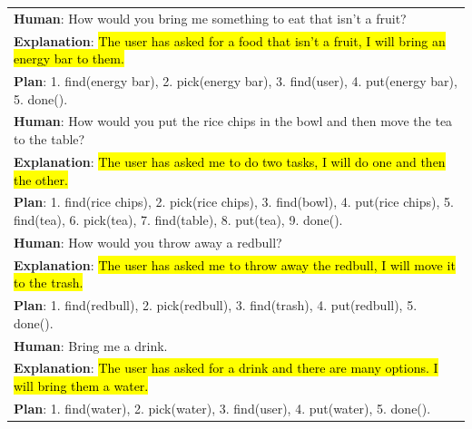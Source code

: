 \begin{table}[H]
\begin{tabular}{p{\linewidth}}
\vspace{0mm} \textbf{Human}: How would you bring me something to eat that isn't a fruit? \\ \vspace{-1mm}
\textbf{Explanation}: \hl{The user has asked for a food that isn't a fruit, I will bring an energy bar to them.}  \\
\textbf{Plan}: 1. find(energy bar), 2. pick(energy bar), 3. find(user), 4. put(energy bar), 5. done().  \\
\vspace{0mm} \textbf{Human}: How would you put the rice chips in the bowl and then move the tea to the table? \\
\textbf{Explanation}: \hl{The user has asked me to do two tasks, I will do one and then the other.}  \\
\textbf{Plan}: 1. find(rice chips), 2. pick(rice chips), 3. find(bowl), 4. put(rice chips), 5. find(tea), 6. pick(tea), 7. find(table), 8. put(tea), 9. done(). \\ 
\vspace{0mm} \textbf{Human}: How would you throw away a redbull? \\ \vspace{-1mm}
\textbf{Explanation}: \hl{The user has asked me to throw away the redbull, I will move it to the trash.} \\
\textbf{Plan}: 1. find(redbull), 2. pick(redbull), 3. find(trash), 4. put(redbull), 5. done(). \\
\vspace{0mm} \textbf{Human}: Bring me a drink. \\ \vspace{-1mm}
\textbf{Explanation}: \hl{The user has asked for a drink and there are many options. I will bring them a water.}  \\
\textbf{Plan}: 1. find(water), 2. pick(water), 3. find(user), 4. put(water), 5. done(). \\
        \bottomrule
    \end{tabular}
    \label{tab:appendix-saycan-prompt}
\end{table}
\endgroup